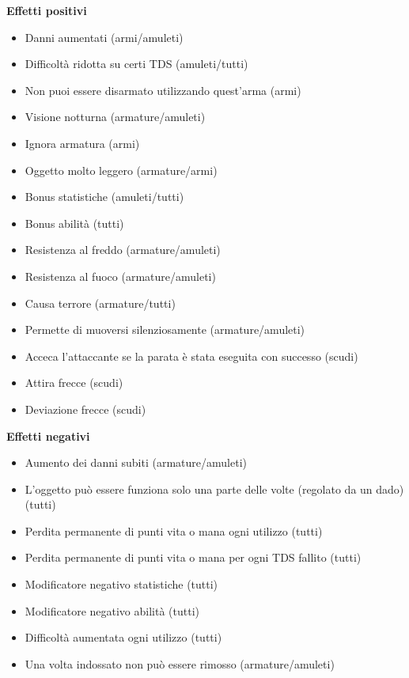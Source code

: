 \documentclass[../manuale_main.tex]{subfiles}
\begin{document}
\textbf{Effetti positivi}
\begin{itemize}
\item Danni aumentati (armi/amuleti)
\item Difficoltà ridotta su certi TDS (amuleti/tutti)
\item Non puoi essere disarmato utilizzando quest'arma (armi)
\item Visione notturna (armature/amuleti)
\item Ignora armatura (armi)
\item Oggetto molto leggero (armature/armi)
\item Bonus statistiche (amuleti/tutti)
\item Bonus abilità (tutti)
\item Resistenza al freddo (armature/amuleti)
\item Resistenza al fuoco (armature/amuleti)
\item Causa terrore (armature/tutti)
\item Permette di muoversi silenziosamente (armature/amuleti)
\item Acceca l'attaccante se la parata è stata eseguita con successo (scudi)
\item Attira frecce (scudi)
\item Deviazione frecce (scudi)
\end{itemize}
\textbf{Effetti negativi}
\begin{itemize}
\item Aumento dei danni subiti (armature/amuleti)
\item L'oggetto può essere funziona solo una parte delle volte (regolato da un dado) (tutti)
\item Perdita permanente di punti vita o mana ogni utilizzo (tutti)
\item Perdita permanente di punti vita o mana per ogni TDS fallito (tutti)
\item Modificatore negativo statistiche (tutti)
\item Modificatore negativo abilità (tutti)
\item Difficoltà aumentata ogni utilizzo (tutti)
\item Una volta indossato non può essere rimosso (armature/amuleti)
\end{itemize}
\end{document}
